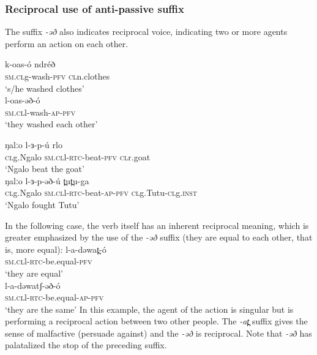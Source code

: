 \subsubsection{Reciprocal use of anti-passive suffix}
The suffix \textit{-əð} also indicates reciprocal voice, indicating two or more agents perform an action on each other. 

\ea
\ea \gll 	k-oas-ó 			ndréð	\\
	\textsc{sm.cl}g-wash-\textsc{pfv} 	\textsc{cl}n.clothes\\
	\trans ‘s/he washed clothes’\\

\ex \gll 	l-oas-əð-ó		\\
	\textsc{sm.cl}l-wash-\textsc{ap-\textsc{pfv}} \\
	\trans ‘they washed each other’\\
\z
\z
	
\ea	
\ea \gll	 	ŋalːo 	     l-ɜ-p-ú 			rlo\\
	\textsc{cl}g.Ngalo  \textsc{sm.cl}l-\textsc{rtc}-beat-\textsc{pfv} 	\textsc{cl}r.goat\\
	\trans ‘Ngalo beat the goat’\\ 

\ex \gll  	ŋalːo 	     l-ɜ-p-əð-ú 			t̪ut̪u-ga\\
	\textsc{cl}g.Ngalo  \textsc{sm.cl}l-\textsc{rtc}-beat-\textsc{ap-\textsc{pfv}} 	\textsc{cl}g.Tutu-\textsc{cl}g.\textsc{inst}\\
	\trans ‘Ngalo fought Tutu’\\
\z
\z

In the following case, the verb itself has an inherent reciprocal meaning, which is greater emphasized by the use of the \textit{-əð} suffix (they are equal to each other, that is, more equal):
\ea
\ea \gll l-a-dəwat̪-ó\\
	\textsc{\textsc{sm.cl}}l-\textsc{rtc}-be.equal-\textsc{pfv}\\ 	
	\trans ‘they are equal’\\

\ex \gll	l-a-dəwatʃ-əð-ó	\\
	\textsc{sm.cl}l-\textsc{rtc}-be.equal-\textsc{ap-\textsc{pfv}} \\
	\trans ‘they are the same’
\z
\z
In this example, the agent of the action is singular but is performing a reciprocal action between two other people. The \textit{-at̪} suffix gives the sense of malfactive (persuade against) and the \textit{-əð} is reciprocal. Note that \textit{-əð} has palatalized the stop of the preceding suffix. 

